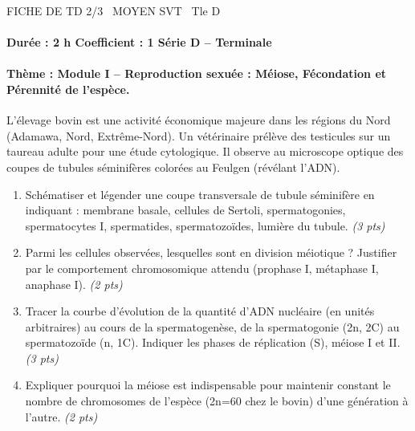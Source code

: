 \documentclass[11pt]{article}
\begin{document}
\begin{tcolorbox}[enhanced,colback=popink,colframe=popink,arc=10pt,boxrule=0pt,left=12pt,right=12pt,top=9pt,bottom=9pt]
{\color{white}\popxbold\small FICHE DE TD 2/3 \textbullet\ MOYEN \hfill SVT \textbullet\ Tle D\par}
\end{tcolorbox}
\vspace{4pt}
\paragraph{Durée : 2 h \hfill Coefficient : 1 \hfill Série D -- Terminale}
\paragraph{Thème : Module I -- Reproduction sexuée : Méiose, Fécondation et Pérennité de l'espèce.}

\begin{exercice}
L'élevage bovin est une activité économique majeure dans les régions du Nord (Adamawa, Nord, Extrême-Nord). Un vétérinaire prélève des testicules sur un taureau adulte pour une étude cytologique. Il observe au microscope optique des coupes de tubules séminifères colorées au Feulgen (révélant l'ADN).
\begin{enumerate}
    \item Schématiser et légender une coupe transversale de tubule séminifère en indiquant : membrane basale, cellules de Sertoli, spermatogonies, spermatocytes I, spermatides, spermatozoïdes, lumière du tubule. \textit{(3 pts)}
    \item Parmi les cellules observées, lesquelles sont en division méiotique ? Justifier par le comportement chromosomique attendu (prophase I, métaphase I, anaphase I). \textit{(2 pts)}
    \item Tracer la courbe d'évolution de la quantité d'ADN nucléaire (en unités arbitraires) au cours de la spermatogenèse, de la spermatogonie (2n, 2C) au spermatozoïde (n, 1C). Indiquer les phases de réplication (S), méiose I et II. \textit{(3 pts)}
    \item Expliquer pourquoi la méiose est indispensable pour maintenir constant le nombre de chromosomes de l'espèce (2n=60 chez le bovin) d'une génération à l'autre. \textit{(2 pts)}
\end{enumerate}
\end{exercice}
\end{document}
